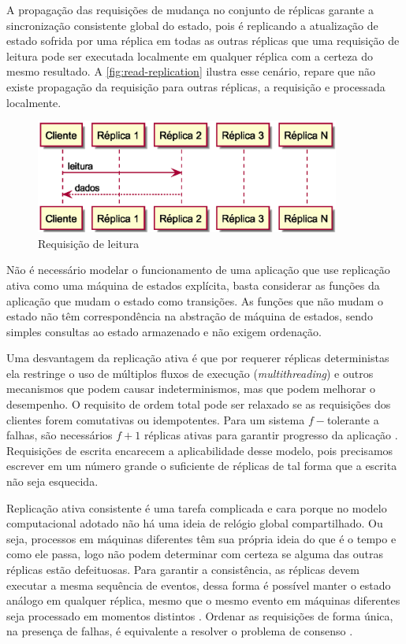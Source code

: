 A propagação das requisições de mudança no conjunto de réplicas garante a sincronização
consistente global do estado, pois é replicando a atualização de estado sofrida por uma
réplica em todas as outras réplicas que uma requisição de leitura pode ser executada
localmente em qualquer réplica com a certeza do mesmo resultado. A
\autoref{fig:read-replication} ilustra esse cenário, repare que não existe propagação da
requisição para outras réplicas, a requisição e processada localmente.

\begin{figure}[htbp]
  \centering
  \includegraphics[width=10cm]{conteudo/capitulos/figuras/leitura.eps}
  \caption{Requisição de leitura}
  \label{fig:read-replication}
\end{figure}

Não é necessário modelar o funcionamento de uma aplicação que use replicação ativa como
uma máquina de estados explícita, basta considerar as funções da aplicação que mudam o
estado como transições. As funções que não mudam o estado não têm correspondência na
abstração de máquina de estados, sendo simples consultas ao estado armazenado e não exigem
ordenação.

Uma desvantagem da replicação ativa é que por requerer réplicas deterministas ela
restringe o uso de múltiplos fluxos de execução (\emph{multithreading}) e outros
mecanismos que podem causar indeterminismos, mas que podem melhorar o desempenho. O
requisito de ordem total pode ser relaxado se as requisições dos clientes forem
comutativas ou idempotentes. Para um sistema $f-$tolerante a falhas, são necessários $f +
1$ réplicas ativas para garantir progresso da aplicação \cite{jalote94, lamport10}.
Requisições de escrita encarecem a aplicabilidade desse modelo, pois precisamos escrever
em um número grande o suficiente de réplicas de tal forma que a escrita não seja
esquecida.

Replicação ativa consistente é uma tarefa complicada e cara porque no modelo computacional
adotado não há uma ideia de relógio global compartilhado. Ou seja, processos em máquinas
diferentes têm sua própria ideia do que é o tempo e como ele passa, logo não podem
determinar com certeza se alguma das outras réplicas estão defeituosas. Para garantir a
consistência, as réplicas devem executar a mesma sequência de eventos, dessa forma é
possível manter o estado análogo em qualquer réplica, mesmo que o mesmo evento em máquinas
diferentes seja processado em momentos distintos \cite{tanenbaum07}. Ordenar as
requisições de forma única, na presença de falhas, é equivalente a resolver o problema de
consenso \cite{chandra96}.


